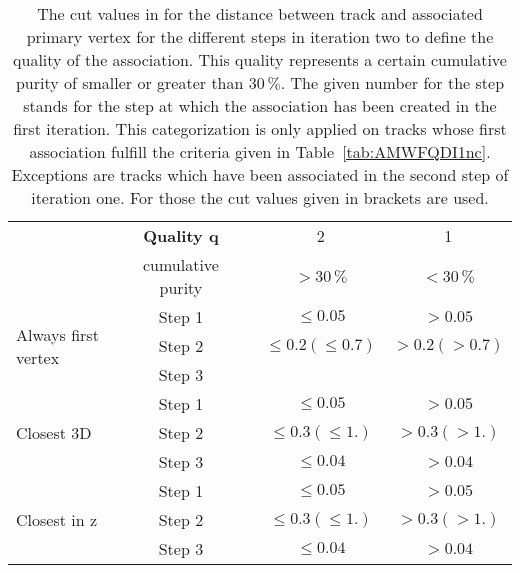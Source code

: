 
\begin{table}[h]
\begin{center}
\caption[Cut values for the distance between track and vertex in iteration two to define the quality of the association]{The cut values in \cm for the distance between track and associated primary vertex for the different steps in iteration two to define the quality of the association. This quality represents a certain cumulative purity of smaller or greater than $30\,\%$. The given number for the step stands for the step at which the association has been created in the first iteration. This categorization is only applied on tracks whose first association fulfill the criteria given in Table~\ref{tab:AMWFQDI1nc}. Exceptions are tracks which have been associated in the second step of iteration one. For those the cut values given in brackets are used.}
\label{tab:AMWFQDI2}

\begin{tabular}{l c c | c | c}
 	& \textbf{Quality q} & & 2 & 1  \\
 	& cumulative purity & & $>30\,\%$ & $<30\,\%$    \\
\hline \hline
\multirow{3}{*}{Always first vertex} 
	& Step 1 & & $\leq0.05$ & $>0.05$ \\
\cline{2-5} 
	 & Step 2 & & $\leq0.2 \left(\leq0.7\right)$ & $>0.2\left(>0.7\right)$ \\
\cline{2-5} 
	& Step 3 & &  &  \\
\hline \hline
\multirow{3}{*}{Closest 3D} 
	& Step 1 & & $\leq0.05$ & $>0.05$ \\
\cline{2-5} 
	 &  Step 2 & & $\leq0.3 \left(\leq1.\right)$ & $>0.3\left(>1.\right)$ \\
\cline{2-5} 
	& Step 3 & & $\leq0.04$ & $>0.04$ \\
\hline \hline
\multirow{3}{*}{Closest in z} 
	& Step 1 & & $\leq0.05$ & $>0.05$ \\
\cline{2-5} 
	 &  Step 2 & & $\leq0.3 \left(\leq1.\right)$ & $>0.3\left(>1.\right)$ \\
\cline{2-5} 
	& Step 3 & & $\leq0.04$ & $>0.04$ \\
\end{tabular}

\end{center}
\end{table}